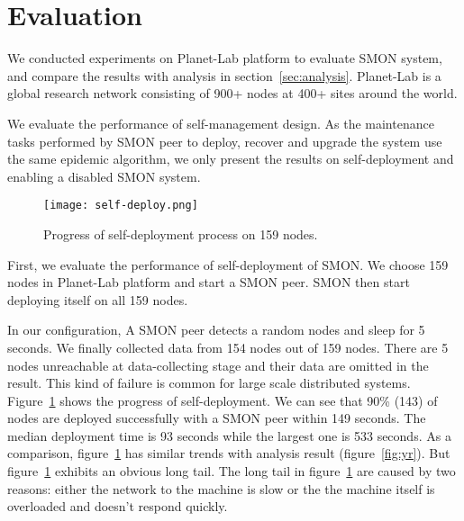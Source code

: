 \section{Evaluation}
\label{sec:eval}

We conducted experiments on Planet-Lab platform to evaluate
SMON system, and compare the results with analysis in
section~\ref{sec:analysis}. Planet-Lab is a global research network
consisting of 900+ nodes at 400+ sites around the
world.

%

We evaluate the performance of self-management design. As
the maintenance tasks performed by SMON peer to deploy,
recover and upgrade the system use the same epidemic
algorithm, we only present the results on self-deployment
and enabling a disabled SMON system. 

\begin{figure}[t]
\centering
\texttt{[image: self-deploy.png]}
\caption{Progress of self-deployment process on 159
nodes.}
\label{fig:self-deploy}
\end{figure}

First, we evaluate the performance of self-deployment of
SMON.  We choose 159 nodes in Planet-Lab platform and start
a SMON peer. SMON then start deploying itself on all 159
nodes.

In our configuration, A SMON peer detects a random nodes and
sleep for 5 seconds. We finally collected data from 154
nodes out of 159 nodes. There are 5 nodes unreachable at
data-collecting stage and their data are omitted in the
result. This kind of failure is common for large scale
distributed systems.  Figure~\ref{fig:self-deploy} shows the
progress of self-deployment. We can see that 90\% (143) of
nodes are deployed successfully with a SMON peer within 149
seconds. The median deployment time is 93 seconds while the
largest one is 533 seconds. As a comparison,
figure~\ref{fig:self-deploy} has similar trends with
analysis result (figure~\ref{fig:yr}). But
figure~\ref{fig:self-deploy} exhibits an obvious long tail.
The long tail in figure~\ref{fig:self-deploy} are caused by
two reasons: either the network to the machine is slow or
the the machine itself is overloaded and doesn't respond
quickly.

